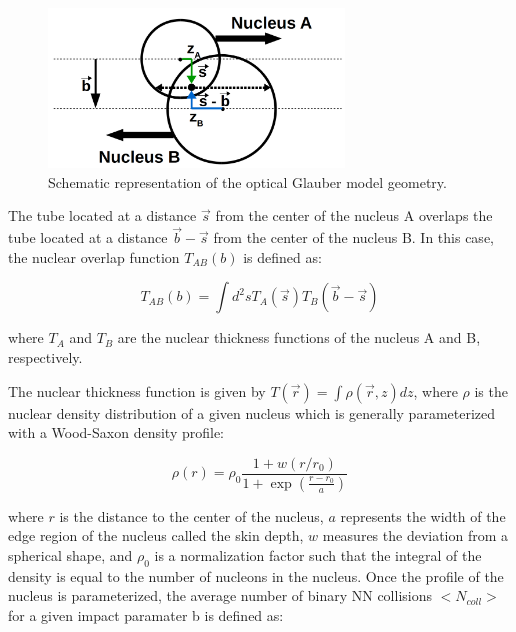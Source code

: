 \begin{figure}[!htbp]
 \begin{center}
  \includegraphics[width=0.7\textwidth]{Figures/Introduction/HeavyIons/GlauberModel.png}
 \end{center}
 \caption{Schematic representation of the optical Glauber model geometry.}
 \label{fig:GlauberModel}
\end{figure}

The tube located at a distance $\vec{s}$ from the center of the nucleus A overlaps the tube located at a distance $\vec{b} - \vec{s}$ from the center of the nucleus B. In this case, the nuclear overlap function $T_{AB}\left(b\right)$ is defined as:

\begin{equation}
  T_{AB}\left(b\right) = {\int}{d^{2}s}T_{A}\left(\vec{s}\right)T_{B}\left(\vec{b}-\vec{s}\right)
\end{equation}

where $T_{A}$ and $T_{B}$ are the nuclear thickness functions of the nucleus A and B, respectively.

The nuclear thickness function is given by $T\left(\vec{r}\right) = {\int}{\rho}\left(\vec{r},z\right)dz$, where $\rho$ is the nuclear density distribution of a given nucleus which is generally parameterized with a Wood-Saxon density profile:

\begin{equation}
  \rho\left(r\right) = \rho_{0}\frac{1+w\left(r/r_{0}\right)}{1+\exp{\left(\frac{r-r_{0}}{a}\right)}}
\end{equation}

where  $r$ is the distance to the center of the nucleus, $a$ represents the width of the edge region of the nucleus called the skin depth, $w$ measures the deviation from a spherical shape, and $\rho_{0}$ is a normalization factor such that the integral of the density is equal to the number of nucleons in the nucleus. Once the profile of the nucleus is parameterized, the average number of binary NN collisions $<N_{coll}>$ for a given impact paramater b is defined as:

